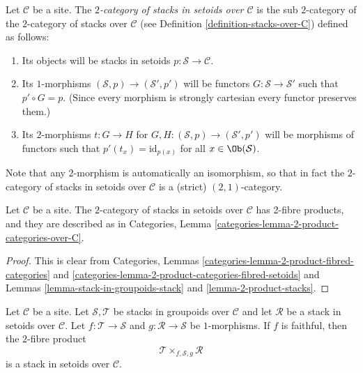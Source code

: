 \begin{definition}
\label{definition-stacks-in-setoids-over-C}
Let $\mathcal{C}$ be a site.
The {\it $2$-category of stacks in setoids over $\mathcal{C}$}
is the sub $2$-category of the $2$-category of stacks
over $\mathcal{C}$ (see Definition \ref{definition-stacks-over-C})
defined as follows:
\begin{enumerate}
\item Its objects will be stacks in setoids
$p : \mathcal{S} \to \mathcal{C}$.
\item Its $1$-morphisms $(\mathcal{S}, p) \to (\mathcal{S}', p')$
will be functors $G : \mathcal{S} \to \mathcal{S}'$ such that
$p' \circ G = p$. (Since every morphism is strongly cartesian
every functor preserves them.)
\item Its $2$-morphisms $t : G \to H$ for
$G, H : (\mathcal{S}, p) \to (\mathcal{S}', p')$
will be morphisms of functors
such that $p'(t_x) = \text{id}_{p(x)}$
for all $x \in \Ob(\mathcal{S})$.
\end{enumerate}
\end{definition}

\noindent
Note that any $2$-morphism is automatically an isomorphism, so
that in fact the $2$-category of stacks in setoids over $\mathcal{C}$
is a (strict) $(2, 1)$-category.

\begin{lemma}
\label{lemma-2-product-stacks-in-setoids}
Let $\mathcal{C}$ be a site.
The $2$-category of stacks in setoids over $\mathcal{C}$
has 2-fibre products, and they are described as in
Categories, Lemma \ref{categories-lemma-2-product-categories-over-C}.
\end{lemma}

\begin{proof}
This is clear from
Categories, Lemmas \ref{categories-lemma-2-product-fibred-categories} and
\ref{categories-lemma-2-product-categories-fibred-setoids}
and
Lemmas \ref{lemma-stack-in-groupoids-stack} and
\ref{lemma-2-product-stacks}.
\end{proof}

\begin{lemma}
\label{lemma-2-fibre-product-gives-stack-in-setoids}
Let $\mathcal{C}$ be a site.
Let $\mathcal{S}, \mathcal{T}$ be stacks in groupoids over $\mathcal{C}$
and let $\mathcal{R}$ be a stack in setoids over $\mathcal{C}$.
Let $f : \mathcal{T} \to \mathcal{S}$ and $g : \mathcal{R} \to \mathcal{S}$
be $1$-morphisms. If $f$ is faithful, then the $2$-fibre product
$$
\mathcal{T} \times_{f, \mathcal{S}, g} \mathcal{R}
$$
is a stack in setoids over $\mathcal{C}$.
\end{lemma}

